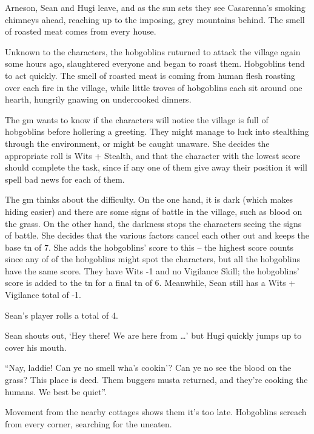 \begin{exampletext}

  Arneson, Sean and Hugi leave, and as the sun sets they see Casarenna's smoking chimneys ahead, reaching up to the imposing, grey mountains behind.
  The smell of roasted meat comes from every house.

  Unknown to the characters, the hobgoblins ruturned to attack the village again some hours ago, slaughtered everyone and began to roast them.
Hobgoblins tend to act quickly.
The smell of roasted meat is coming from human flesh roasting over each fire in the village, while little troves of hobgoblins each sit around one hearth, hungrily gnawing on undercooked dinners.

  The \gls{gm} wants to know if the characters will notice the village is full of hobgoblins before hollering a greeting.
  They might manage to luck into stealthing through the environment, or might be caught unaware.
  She decides the appropriate roll is Wits + Stealth, and that the character with the lowest score should complete the task, since if any one of them give away their position it will spell bad news for each of them.

  The \gls{gm} thinks about the difficulty.
  On the one hand, it is dark (which makes hiding easier) and there are some signs of battle in the village, such as blood on the grass.
  On the other hand, the darkness stops the characters seeing the signs of battle.
  She decides that the various factors cancel each other out and keeps the base \gls{tn} of 7.
  She adds the hobgoblins' score to this -- the highest score counts since any of of the hobgoblins might spot the characters, but all the hobgoblins have the same score.
  They have Wits -1 and no Vigilance Skill; the hobgoblins' score is added to the \gls{tn} for a final \gls{tn} of 6.
  Meanwhile, Sean still has a Wits + Vigilance total of -1.

  Sean's player rolls a total of 4.

  Sean shouts out, `Hey there! We are here from \dots' but Hugi quickly jumps up to cover his mouth.

  ``Nay, laddie! Can ye no smell wha's cookin'? Can ye no see the blood on the grass? This place is deed. Them buggers musta returned, and they're cooking the humans. We best be quiet''.

  Movement from the nearby cottages shows them it's too late.
  Hobgoblins screach from every corner, searching for the uneaten.

\end{exampletext}

